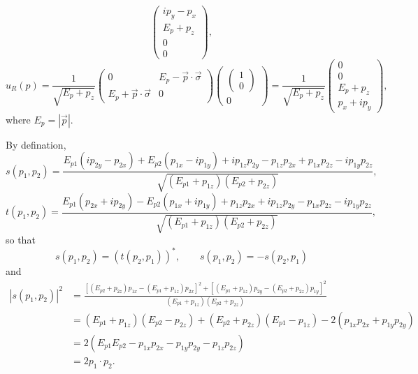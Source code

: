 \begin{problembody}
\begin{equation*}
\begin{pmatrix}
            ip_y - p_x \\
            E_p + p_z \\
            0 \\
            0
        \end{pmatrix},
    \end{equation*}
    \begin{equation*}
        u_R(p) = \frac{1}{\sqrt{E_p + p_z}} \begin{pmatrix}
            0 & E_p - \vec{p}\cdot\vec{\sigma} \\
            E_p + \vec{p}\cdot\vec{\sigma} & 0
        \end{pmatrix} \begin{pmatrix}
            \begin{pmatrix}
                1 \\ 0
            \end{pmatrix} \\
            0
        \end{pmatrix} = \frac{1}{\sqrt{E_p + p_z}} \begin{pmatrix}
            0 \\
            0 \\
            E_p + p_z \\
            p_x + ip_y
        \end{pmatrix},
    \end{equation*}
    where $E_p = |\vec{p}|$.

    \item By defination,
    \begin{equation*}
        s(p_1, p_2) = \frac{
            E_{p1}(ip_{2y} - p_{2x}) + E_{p2}(p_{1x} - ip_{1y}) + ip_{1z}p_{2y}
         - p_{1z}p_{2x} + p_{1x}p_{2z} - ip_{1y}p_{2z}
        } {\sqrt{(E_{p1} + p_{1z})(E_{p2} + p_{2z})}},
    \end{equation*}
    \begin{equation*}
        t(p_1, p_2) = \frac{
            E_{p1}(p_{2x} + ip_{2y}) - E_{p2}(p_{1x} + ip_{1y}) + p_{1z}p_{2x}
         + ip_{1z}p_{2y} - p_{1x}p_{2z} - ip_{1y}p_{2z}
        } {\sqrt{(E_{p1} + p_{1z})(E_{p2} + p_{2z})}},
    \end{equation*}
    so that
    \begin{equation*}
        s(p_1, p_2) = (t(p_2, p_1))^\ast, \qquad s(p_1, p_2) = -s(p_2, p_1)
    \end{equation*}
    and 
    \begin{align*}
        \left| s(p_1, p_2) \right|^2 & = \frac{
            \left[(E_{p2} + p_{2z})p_{1x} - (E_{p1} + p_{1z})p_{2x}\right]^2 
            + \left[(E_{p1} + p_{1z})p_{2y} - (E_{p2} + p_{2z})p_{1y}\right]^2
        }
        {(E_{p1} + p_{1z})(E_{p2} + p_{2z})} \\
        & = (E_{p1} + p_{1z})(E_{p2} - p_{2z}) + (E_{p2} + p_{2z})(E_{p1} - p_{1z}) - 2(p_{1x}p_{2x} + p_{1y}p_{2y}) \\
        & = 2(E_{p1}E_{p2} - p_{1x}p_{2x} - p_{1y}p_{2y} - p_{1z}p_{2z})\\
        & = 2 p_1 \cdot p_2.
    \end{align*}
\end{problembody}

